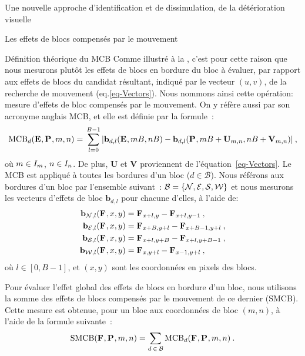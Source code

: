 \begin{chapter}{Une nouvelle approche d'identification et de dissimulation, de
la détérioration visuelle}
\begin{section}{Les effets de blocs compensés par le mouvement}
\begin{subsection}{Définition théorique du MCB}
Comme illustré à la  , c'est pour cette raison que
nous mesurons plutôt les effets de blocs en bordure du bloc à évaluer, par rapport aux effets
de blocs du candidat résultant, indiqué par le vecteur $(u,v)$, de la recherche
de mouvement (eq.\ref{eq-Vectors}). Nous nommons ainsi cette opération: mesure
d'effets de bloc compensés par le mouvement. On y réfère aussi par son acronyme
anglais MCB, et elle est définie par la formule~:
\begin{equation}
\label{eq-blk}
\textrm{MCB}_{d}(\mathbf{E}_{},\mathbf{P}_{}, m,n) = \\ \sum_{l = 0}^{B-1} | \mathbf{b}_{d,l}(\mathbf{E}_{},m B,n
B) - \mathbf{b}_{d, l}(\mathbf{P}_{},m B+\mathbf{U}_{m, n}, n B +\mathbf{V}_{m, n}) |\:,
\end{equation}
où \mbox{$m \in I_{m}$}, \mbox{$n \in I_{n}$}. De plus, $\mathbf{U}$ et
$\mathbf{V}$ proviennent de l'équation~\eqref{eq-Vectors}. Le MCB est appliqué à
toutes les bordures d'un bloc ($d \in \mathcal{B}$). Nous référons aux bordures
d'un bloc par l'ensemble suivant~: $\mathcal{B}=\{\mathcal{N}, \mathcal{E},
\mathcal{S}, \mathcal{W}\}$ et nous mesurons les vecteurs d'effets de bloc
$\mathbf{b}_{d, l}$ pour chacune d'elles, à l'aide de:
\begin{align}
\mathbf{b}_{\mathcal{N}, l}(\mathbf{F}_{}, x,y) &= \mathbf{F}_{x+l,y} - \mathbf{F}_{x+l,y-1}\:, \\
\mathbf{b}_{\mathcal{E}, l}(\mathbf{F}_{}, x,y) &= \mathbf{F}_{x+B,y+l} - \mathbf{F}_{x+B-1,y+l}\:, \\
\mathbf{b}_{\mathcal{S}, l}(\mathbf{F}_{}, x,y) &= \mathbf{F}_{x+l,y+B} - \mathbf{F}_{x+l,y+B-1}\:, \\
\mathbf{b}_{\mathcal{W}, l}(\mathbf{F}_{}, x,y) &= \mathbf{F}_{x,y+l} - \mathbf{F}_{x-1,y+l}\:,
\end{align}
où $l \in [0, B-1]$, et $(x,y)$ sont les
coordonnées en pixels des blocs.

Pour évaluer l'effet global des effets de blocs en bordure d'un bloc, nous
utilisons la somme des effets de blocs compensés par le mouvement de ce dernier
($\textrm{SMCB}$). Cette mesure est obtenue, pour un bloc aux coordonnées de
bloc $(m,n)$, à l'aide de la formule suivante~:
\begin{equation}
\label{eq-SumTB}
\textrm{SMCB}(\mathbf{F}_{},\mathbf{P}_{}, m,n) =
\sum_{d\:\in\:\mathcal{B}}\textrm{MCB}_{d}(\mathbf{F}_{},\mathbf{P}_{},m,n)\:.
\end{equation}


\end{subsection}
\end{section}
\end{chapter}
